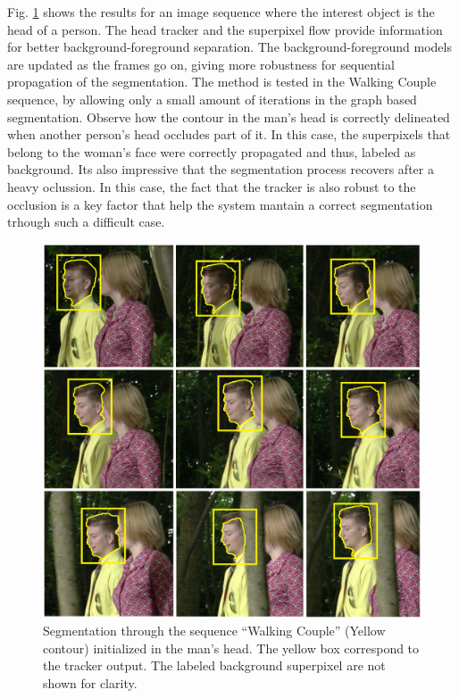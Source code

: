 Fig. \ref{figurelabel_walking} shows the results for an image sequence where the interest object is the head of a person.
The head tracker and the superpixel flow provide information for better background-foreground separation. The
background-foreground models are updated as the frames go on, giving more robustness for sequential
propagation of the segmentation. The method is tested in the Walking Couple sequence, by allowing only a small amount of iterations in the
graph based segmentation. Observe how the contour in the man's head is correctly delineated when
another person's head occludes part of it. In this case, the superpixels that belong to the woman’s face
were correctly propagated and thus, labeled as background. Its also impressive that the segmentation process recovers after a heavy oclussion.
In this case, the fact that the tracker is also robust to the occlusion is a key factor that help the system mantain a correct segmentation trhough such a difficult 
case.

   \begin{figure}[thpb]
      \centering
      \includegraphics[width=1.0\textwidth]{../images/Sequence.png}
      \caption{Segmentation through the sequence “Walking
	       Couple” (Yellow contour) initialized in the man’s head. The yellow box correspond to the tracker output.
	        The labeled background superpixel are not shown for clarity.}
      \label{figurelabel_walking}
   \end{figure}

